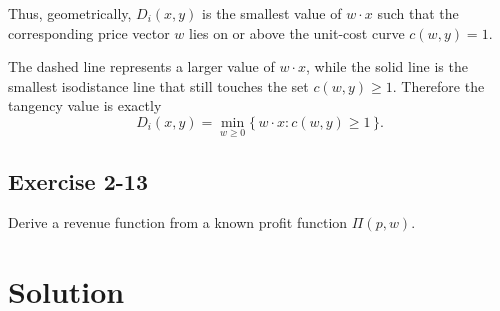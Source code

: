 Thus, geometrically, \(D_i(x,y)\) is the smallest value of \(w\cdot x\) such that the corresponding price vector \(w\) lies on or above the unit-cost curve \(c(w,y)=1\).

\bigskip

\begin{center}
\end{center}

\noindent
The dashed line represents a larger value of \(w\cdot x\), while the solid line is the smallest isodistance line that still touches the set \(c(w,y)\ge 1\). Therefore the tangency value is exactly
\[
D_i(x,y)=\min_{w\ge 0}\{\,w\cdot x : c(w,y)\ge 1\,\}.
\]


\vspace{30pt}
\begin{tcolorbox}[breakable]

\subsection*{Exercise 2-13}

Derive a revenue function from a known profit function $\Pi(p,w)$.

\end{tcolorbox}


\section*{Solution}

